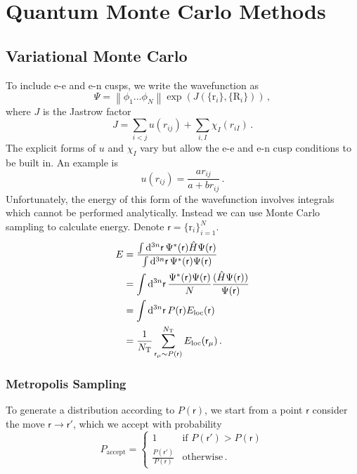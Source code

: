 \documentclass{article}
\theoremstyle{plain}\theoremheaderfont{\normalfont\itshape}\theorembodyfont{\rmfamily}\theoremseparator{.}\newtheorem*{rem}{Remark}\newtheorem*{ex}{Example}\newtheorem*{proof}{Proof}\newtheorem*{altp}{Alternative proof}
\theoremstyle{plain}\theoremheaderfont{\normalfont\bfseries}\theorembodyfont{\rmfamily}\theoremseparator{.}\newtheorem{thm}{Theorem}[section]\newtheorem{lem}[thm]{Lemma}\newtheorem{prop}[thm]{Proposition}\newtheorem*{cor}{Corollary}\newtheorem{defn}[thm]{Definition}\newtheorem{clm}[thm]{Claim}\newtheorem{clminproof}{Claim}
\theoremstyle{break}\theoremheaderfont{\normalfont\itshape}\theorembodyfont{\rmfamily}\theoremseparator{.\medskip}\newtheorem*{proofskip}{Proof}\newtheorem*{exs}{Examples}\newtheorem*{rems}{Remarks}
\theoremstyle{break}\theoremheaderfont{\normalfont\bfseries}\theorembodyfont{\rmfamily}\theoremseparator{.\medskip}\newtheorem{lemskip}[thm]{Lemma}\newtheorem{defnskip}[thm]{Definition}\newtheorem{propskip}[thm]{Proposition}\newtheorem{thmskip}[thm]{Theorem}
\numberwithin{equation}{section}
\newcommand{\dd}[2][]{\mathrm{d}^{#1} #2\,}
\newcommand{\vb}[1]{\bm{\mathrm{#1}}}
\newcommand{\norm}[1]{\left\| #1 \right\|}
\newcommand{\rr}{\mathsf{r}}
\begin{document}
    \newpage
    \section{Quantum Monte Carlo Methods}
    \subsection{Variational Monte Carlo}
    To include e-e and e-n cusps, we write the wavefunction as
    \begin{equation}
        \Psi=\norm{\phi_1\dots\phi_N}\exp(J(\{\vb{r}_i\},\{\vb{R}_i\}))\,,
    \end{equation}
    where \(J\) is the Jastrow factor
    \begin{equation}
        J=\sum_{i<j}u(r_{ij})+\sum_{i,I}\chi_I(r_{iI})\,.
    \end{equation}
    The explicit forms of \(u\) and \(\chi_I\) vary but allow the e-e and e-n cusp conditions to be built in. An example is
    \begin{equation}
        u(r_{ij})=\frac{ar_{ij}}{a+br_{ij}}\,.
    \end{equation}
    Unfortunately, the energy of this form of the wavefunction involves integrals which cannot be performed analytically. Instead we can use Monte Carlo sampling to calculate energy. Denote \(\rr=\{\vb{r}_i\}_{i=1}^{N}\).
    \begin{align}
        E&=\frac{\int\dd[3n]{\rr}\Psi^*(\rr)\hat{H}\Psi(\rr)}{\int\dd[3n]{\rr}\Psi^*(\rr)\Psi(\rr)}\notag\\
        &=\int\dd[3n]{\rr}\frac{\Psi^*(\rr)\Psi(\rr)}{N}\frac{(\hat{H}\Psi(\rr))}{\Psi(\rr)}\notag\\
        &=\int\dd[3n]{\rr}P(\rr)E_{\text{loc}}(\rr)\notag\\
        &=\frac{1}{N_{\text{T}}}\sum_{\rr_\mu\sim P(\rr)}^{N_{\text{T}}}E_{\text{loc}}(\rr_\mu)\,.
    \end{align}

    \subsubsection{Metropolis Sampling}
    To generate a distribution according to \(P(\rr)\), we start from a point \(\rr\) consider the move \(\rr\to\rr'\), which we accept with probability
    \begin{equation}
        P_{\text{accept}}=\begin{cases}
            1 & \text{if }P(\rr')>P(\rr)\\
            \frac{P(\rr')}{P(\rr)} & \text{otherwise}\,.
        \end{cases}
    \end{equation}
\end{document}

